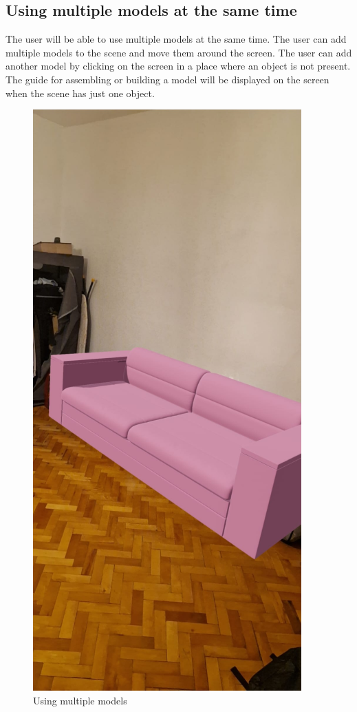 \subsection{Using multiple models at the same time}
The user will be able to use multiple models at the same time. The user can add multiple models to the scene and move them around the screen. The user can add another model by clicking on the screen in a place where an object is not present. The guide for assembling or building a model will be displayed on the screen when the scene has just one object.
\begin{figure}[h!]
    \begin{center}
        \includegraphics[scale=0.5]{img/App_mock/iPhone 14 - 11.png}
        \caption{Using multiple models}
        \label{fig:using-multiple-models}
    \end{center}
\end{figure}
\pagebreak

